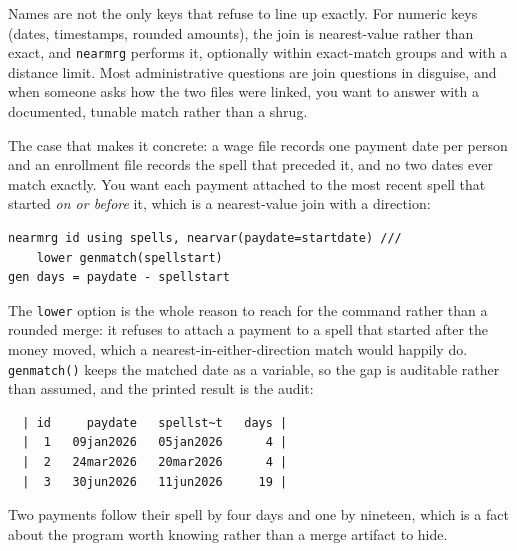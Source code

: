 \documentclass[
    a4paper,
    fontsize=10pt,
    twoside=true,
    numbers=noenddot,
]{kaobook}
\begin{document}
Names are not the only keys that refuse to line up exactly. For numeric keys (dates, timestamps, rounded amounts), the join is nearest-value rather than exact, and \texttt{nearmrg} performs it, optionally within exact-match groups and with a distance limit. Most administrative questions are join questions in disguise, and when someone asks how the two files were linked, you want to answer with a documented, tunable match rather than a shrug.

The case that makes it concrete: a wage file records one payment date per person and an enrollment file records the spell that preceded it, and no two dates ever match exactly. You want each payment attached to the most recent spell that started \emph{on or before} it, which is a nearest-value join with a direction:
\par
{\footnotesize
\begin{verbatim}
nearmrg id using spells, nearvar(paydate=startdate) ///
    lower genmatch(spellstart)
gen days = paydate - spellstart
\end{verbatim}
}
The \texttt{lower} option is the whole reason to reach for the command rather than a rounded merge: it refuses to attach a payment to a spell that started after the money moved, which a nearest-in-either-direction match would happily do. \texttt{genmatch()} keeps the matched date as a variable, so the gap is auditable rather than assumed, and the printed result is the audit:
\par
{\footnotesize
\begin{verbatim}
  | id     paydate   spellst~t   days |
  |  1   09jan2026   05jan2026      4 |
  |  2   24mar2026   20mar2026      4 |
  |  3   30jun2026   11jun2026     19 |
\end{verbatim}
}
Two payments follow their spell by four days and one by nineteen, which is a fact about the program worth knowing rather than a merge artifact to hide.

\end{document}
